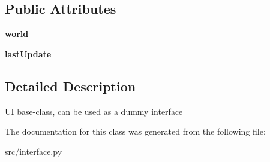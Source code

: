 \subsection*{Public Attributes}
\begin{DoxyCompactItemize}
\item 
\hypertarget{classsrc_1_1interface_1_1_interface_ae3f574913c0f42acfe8869b6f1b53f97}{}\label{classsrc_1_1interface_1_1_interface_ae3f574913c0f42acfe8869b6f1b53f97} 
{\bfseries world}
\item 
\hypertarget{classsrc_1_1interface_1_1_interface_a6841bfb944d99e869903790a57cd57ab}{}\label{classsrc_1_1interface_1_1_interface_a6841bfb944d99e869903790a57cd57ab} 
{\bfseries last\+Update}
\end{DoxyCompactItemize}


\subsection{Detailed Description}
\begin{DoxyVerb}UI base-class, can be used as a dummy interface \end{DoxyVerb}
 

The documentation for this class was generated from the following file\+:\begin{DoxyCompactItemize}
\item 
src/interface.\+py\end{DoxyCompactItemize}
